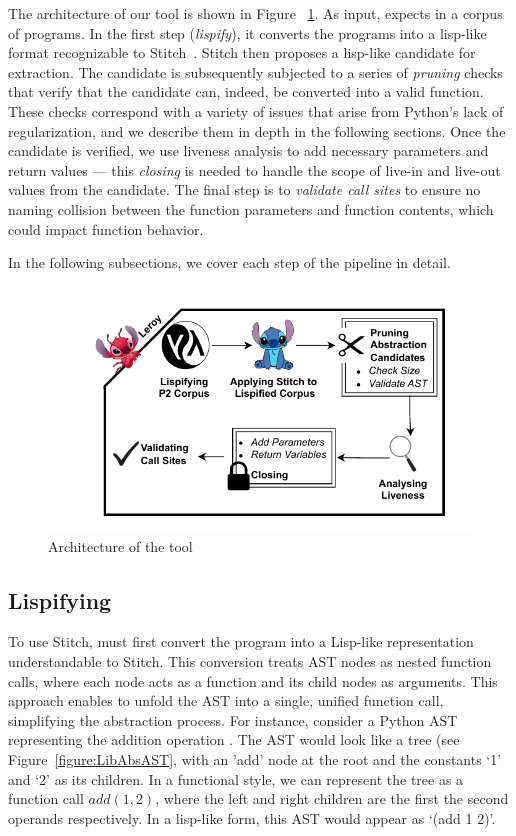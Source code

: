 The architecture of our \toolname{} tool is shown in Figure ~\ref{fig:design}. As input,
\toolname{} expects in a corpus of \ptwo{} programs.  In the first step (\emph{lispify}), it converts the \ptwo{} programs into a lisp-like format recognizable to Stitch~\cite{Bowers_2023stitch}.  Stitch then proposes a lisp-like candidate for extraction.  The candidate is subsequently subjected to a series of \emph{pruning} checks that verify that the candidate can, indeed, be converted into a valid \ptwo{} function.  These checks correspond with a variety of issues that arise from Python's lack of regularization, and we describe them in depth in the following sections.  Once the candidate is verified, we use liveness analysis to add necessary parameters and return values --- this \emph{closing} is needed to handle the scope of live-in and live-out values from the candidate.  The final step is to \emph{validate call sites} to ensure no naming collision between the function parameters and function contents, which could impact function behavior. 

In the following subsections, we cover each step of the \toolname{} pipeline in detail.



\begin{figure}
  \includegraphics[width=\textwidth]{images/Design2.pdf}
  \caption{Architecture of the \toolname{} tool}
  \label{fig:design}
\end{figure}


\subsection{Lispifying}
\label{sec:lispify}
To use Stitch, \toolname must first convert the \ptwo{} program into a Lisp-like representation understandable to Stitch. 
This conversion treats AST nodes as nested function calls, where each node acts as a function and its child nodes as arguments. This approach enables \toolname to unfold the AST into a single, unified function call, simplifying the abstraction process.
For instance, consider a Python AST representing the addition operation . 
The AST would look like a tree (see Figure~\ref{figure:LibAbsAST}, with an 'add' node at the root and the constants `1' and `2' as its children. 
In a functional style, we can represent the tree as a function call $add(1, 2)$, where the left and right children are the first the second operands respectively. 
In a lisp-like form, this AST would appear as `(add 1 2)'. 

